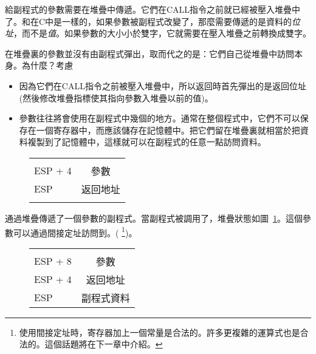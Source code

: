 給副程式的參數需要在堆疊中傳遞。它們在{\code CALL}指令之前就已經被壓入堆疊中了。和在C中是一樣的，如果參數被副程式改變了，那麼需要傳遞的是資料的\emph{位址}，而不是\emph{值}。如果參數的大小小於雙字，它就需要在壓入堆疊之前轉換成雙字。

在堆疊裏的參數並沒有由副程式彈出，取而代之的是：它們自己從堆疊中訪問本身。為什麼？考慮
\begin{itemize}
\item 因為它們在{\code CALL}指令之前被壓入堆疊中，所以返回時首先彈出的是返回位址(然後修改堆疊指標使其指向參數入堆疊以前的值)。
\item 參數往往將會使用在副程式中幾個的地方。通常在整個程式中，它們不可以保存在一個寄存器中，而應該儲存在記憶體中。把它們留在堆疊裏就相當於把資料複製到了記憶體中，這樣就可以在副程式的任意一點訪問資料。
\end{itemize}

\begin{figure}
\centering
\begin{tabular}{l|c|}
\cline{2-2}
&  \\ \cline{2-2}
ESP + 4 & 參數 \\ \cline{2-2}
ESP &返回地址\\ \cline{2-2}
& \\ \cline{2-2}
\end{tabular}
\caption{}
\label{fig:stack1}
\end{figure}
通過堆疊傳遞了一個參數的副程式。當副程式被調用了，堆疊狀態如圖~\ref{fig:stack1}。這個參數可以通過間接定址訪問到。({\code
[ESP+4]}
\footnote{使用間接定址時，寄存器加上一個常量是合法的。許多更複雜的運算式也是合法的。這個話題將在下一章中介紹。})。
\begin{figure}
\centering
\begin{tabular}{l|c|}
\cline{2-2}
&  \\ \cline{2-2}
ESP + 8 & 參數 \\ \cline{2-2}
ESP + 4 & 返回地址 \\ \cline{2-2}
ESP     & 副程式資料 \\ \cline{2-2}
\end{tabular}
\caption{}
\label{fig:stack2}
\end{figure}

